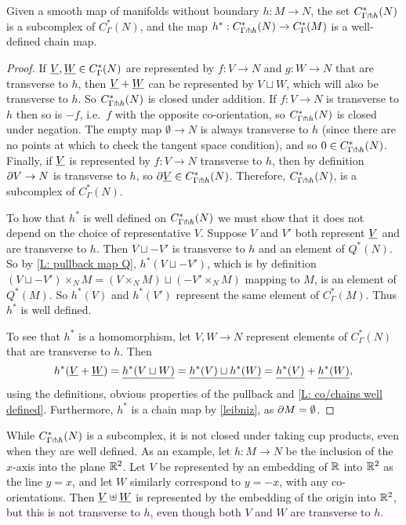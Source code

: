 \begin{proposition}
Given a smooth map of manifolds without boundary $h \colon M \to N$, the set $C^*_{\Gamma\pitchfork h}(N)$ is a subcomplex of $C^*_{\Gamma}(N)$, and the map $h^*:C^*_{\Gamma\pitchfork h}(N) \to C^*_{\Gamma}(M)$ is a well-defined chain map.
\end{proposition}
\begin{proof}
If $\underline{V},\underline{W} \in C^*_\Gamma(N)$ are represented by $f \colon V \to N$ and $g \colon W \to N$ that are transverse to $h$, then $\underline{V}+\underline{W}$ can be represented by $V \sqcup W$, which will also be transverse to $h$. So $C^*_{\Gamma\pitchfork h}(N)$ is closed under addition. If $f \colon V \to N$ is transverse to $h$ then so is $-f$, i.e.\ $f$ with the opposite co-orientation, so $C^*_{\Gamma\pitchfork h}(N)$ is closed under negation. The empty map $\emptyset \to N$ is always transverse to $h$ (since there are no points at which to check the tangent space condition), and so $0 \in C^*_{\Gamma\pitchfork h}(N)$. Finally, if $\underline{V}$ is represented by $f \colon V \to N$ transverse to $h$, then by definition $\partial V \to N$ is transverse to $h$, so $\partial \underline{V} \in C^*_{\Gamma\pitchfork h}(N)$. Therefore, $C^*_{\Gamma\pitchfork h}(N)$, is a subcomplex of $C^*_{\Gamma}(N)$.

To how that $h^*$ is well defined on $C^*_{\Gamma\pitchfork h}(N)$ we must show that it does not depend on the choice of representative $V$. Suppose $V$ and $V'$ both represent $\underline{V}$ and are transverse to $h$. Then $V \sqcup -V'$ is transverse to $h$ and an element of $Q^*(N)$. So by \cref{L: pullback map Q}, $h^*(V \sqcup -V')$, which is by definition $(V \sqcup -V') \times_N M = (V \times_N M) \sqcup (-V' \times_N M)$ mapping to $M$, is an element of $Q^*(M)$. So $h^*(V)$ and $h^*(V')$ represent the same element of $C^*_{\Gamma}(M)$. Thus $h^*$ is well defined.

To see that $h^*$ is a homomorphism, let $V,W \to N$ represent elements of $C^*_{\Gamma}(N)$ that are transverse to $h$. Then
$$h^*(\underline{V}+\underline{W}) = \underline{h^*(V \sqcup W)} = \underline{h^*(V) \sqcup h^*(W)} = \underline{h^*(V)}+\underline{h^*(W)},$$
using the definitions, obvious properties of the pullback and \cref{L: co/chains well defined}. Furthermore, $h^*$ is a chain map by \cref{leibniz}, as $\partial M = \emptyset$.
\end{proof}



\begin{remark}
While $C^*_{\Gamma\pitchfork h}(N)$ is a subcomplex, it is not closed under taking cup products, even when they are well defined. As an example, let $h \colon M \to N$ be the inclusion of the $x$-axis into the plane $\mathbb{R}^2$. Let $V$ be represented by an embedding of $\mathbb{R}$ into $\mathbb{R}^2$ as the line $y = x$, and let $W$ similarly correspond to $y = -x$, with any co-orientations. Then $\underline{V} \uplus \underline{W}$ is represented by the embedding of the origin into $\mathbb{R}^2$, but this is not transverse to $h$, even though both $V$ and $W$ are transverse to $h$.
\end{remark}


